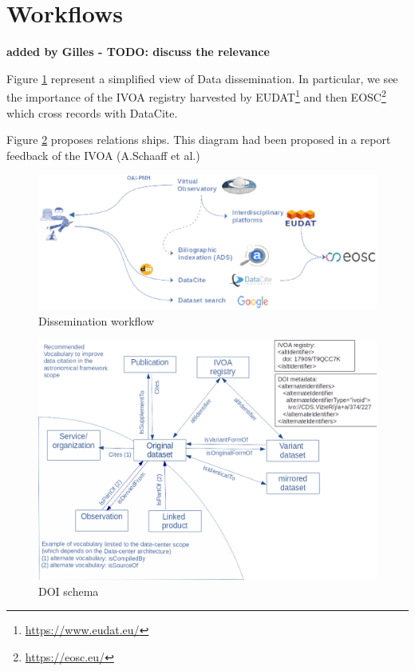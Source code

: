 \documentclass[11pt,a4paper]{ivoa}
\begin{document}
\section{Workflows}
\textbf{\color{red} added by Gilles - TODO: discuss the relevance}

Figure \ref{fig:diag-dissemination} represent a simplified view of Data dissemination.
In particular, we see the importance of the IVOA registry harvested by EUDAT\footnote{\url{https://www.eudat.eu/}} and then EOSC\footnote{\url{https://eosc.eu/}} which cross records with DataCite.


Figure \ref{fig:doi-schema} proposes relations ships. This diagram had been proposed in a report feedback of the IVOA (A.Schaaff et al.)

\begin{figure}[!h]
\centering
\includegraphics[width=\textwidth]{diag_dissemination2.eps}
\caption{Dissemination workflow}
\label{fig:diag-dissemination}
\end{figure}

\begin{figure}[!h]
	\centering
	\includegraphics[width=\textwidth]{schema-doi.png}
	\caption{DOI schema}
	\label{fig:doi-schema}
\end{figure}
\end{document}
